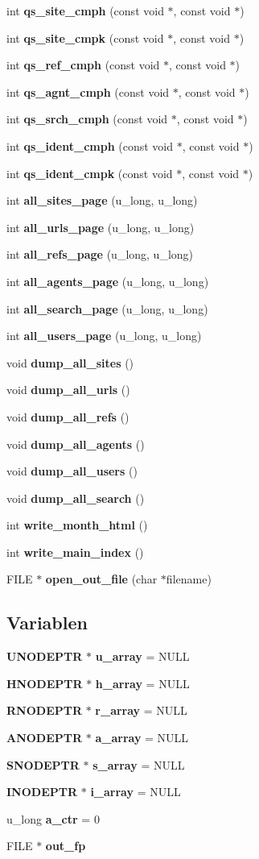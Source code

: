 \begin{CompactItemize}
\item 
int {\bf qs\_\-site\_\-cmph} (const void $\ast$, const void $\ast$)
\item 
int {\bf qs\_\-site\_\-cmpk} (const void $\ast$, const void $\ast$)
\item 
int {\bf qs\_\-ref\_\-cmph} (const void $\ast$, const void $\ast$)
\item 
int {\bf qs\_\-agnt\_\-cmph} (const void $\ast$, const void $\ast$)
\item 
int {\bf qs\_\-srch\_\-cmph} (const void $\ast$, const void $\ast$)
\item 
int {\bf qs\_\-ident\_\-cmph} (const void $\ast$, const void $\ast$)
\item 
int {\bf qs\_\-ident\_\-cmpk} (const void $\ast$, const void $\ast$)
\item 
int {\bf all\_\-sites\_\-page} (u\_\-long, u\_\-long)
\item 
int {\bf all\_\-urls\_\-page} (u\_\-long, u\_\-long)
\item 
int {\bf all\_\-refs\_\-page} (u\_\-long, u\_\-long)
\item 
int {\bf all\_\-agents\_\-page} (u\_\-long, u\_\-long)
\item 
int {\bf all\_\-search\_\-page} (u\_\-long, u\_\-long)
\item 
int {\bf all\_\-users\_\-page} (u\_\-long, u\_\-long)
\item 
void {\bf dump\_\-all\_\-sites} ()
\item 
void {\bf dump\_\-all\_\-urls} ()
\item 
void {\bf dump\_\-all\_\-refs} ()
\item 
void {\bf dump\_\-all\_\-agents} ()
\item 
void {\bf dump\_\-all\_\-users} ()
\item 
void {\bf dump\_\-all\_\-search} ()
\item 
int {\bf write\_\-month\_\-html} ()
\item 
int {\bf write\_\-main\_\-index} ()
\item 
FILE $\ast$ {\bf open\_\-out\_\-file} (char $\ast$filename)
\end{CompactItemize}
\subsection*{Variablen}
\begin{CompactItemize}
\item 
{\bf UNODEPTR} $\ast$ {\bf u\_\-array} = NULL
\item 
{\bf HNODEPTR} $\ast$ {\bf h\_\-array} = NULL
\item 
{\bf RNODEPTR} $\ast$ {\bf r\_\-array} = NULL
\item 
{\bf ANODEPTR} $\ast$ {\bf a\_\-array} = NULL
\item 
{\bf SNODEPTR} $\ast$ {\bf s\_\-array} = NULL
\item 
{\bf INODEPTR} $\ast$ {\bf i\_\-array} = NULL
\item 
u\_\-long {\bf a\_\-ctr} = 0
\item 
FILE $\ast$ {\bf out\_\-fp}
\end{CompactItemize}


